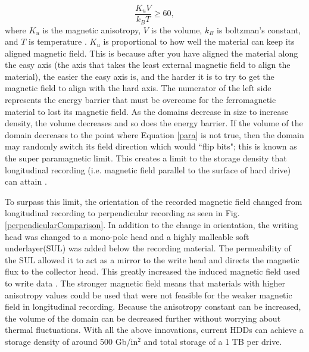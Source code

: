 \documentclass[ notitlepage, numerical, 11pt]{revtex4-1} %
\begin{document}
\begin{equation}
\frac{K_uV}{k_BT} \geq 60,
\label{para}
\end{equation}
where $K_u$ is the magnetic anisotropy, $V$ is the volume, $k_B$ is boltzman's constant, and $T$ is temperature \cite{memory}. $K_u$ is proportional to how well the material can keep its aligned magnetic field. This is because after you have aligned the material along the easy axis (the axis that takes the least external magnetic field to align the material), the easier the easy axis is, and the harder it is to try to get the magnetic field to align with the hard axis. The numerator of the left side represents the energy barrier that must be overcome for the ferromagnetic material to lost its magnetic field. As the domains decrease in size to increase density, the volume decreases and so does the energy barrier. If the volume of the domain decreases to the point where Equation \ref{para} is not true, then the domain may randomly switch its field direction which would ``flip bits"; this is known as the super paramagnetic limit. This creates a limit to the storage density that longitudinal recording (i.e. magnetic field parallel to the surface of hard drive) can attain \cite{perpendicular}.

To surpass this limit, the orientation of the recorded magnetic field changed from longitudinal recording to perpendicular recording as seen in Fig. \ref{perpendicularComparison}. In addition to the change in orientation, the writing head was changed to a mono-pole head and a highly malleable soft underlayer(SUL) was added below the recording material. The permeability of the SUL allowed it to act as a mirror to the write head and directs the magnetic flux to the collector head. This greatly increased the induced magnetic field used to write data \cite{highDensity}. The stronger magnetic field means that materials with higher anisotropy values could be used that were not feasible for the weaker magnetic field in longitudinal recording. Because the anisotropy constant can be increased, the volume of the domain can be decreased further without worrying about thermal fluctuations. With all the above innovations, current HDDs can achieve a storage density of around 500 Gb/in$^2$ and total storage of a 1 TB per drive.
\end{document}
